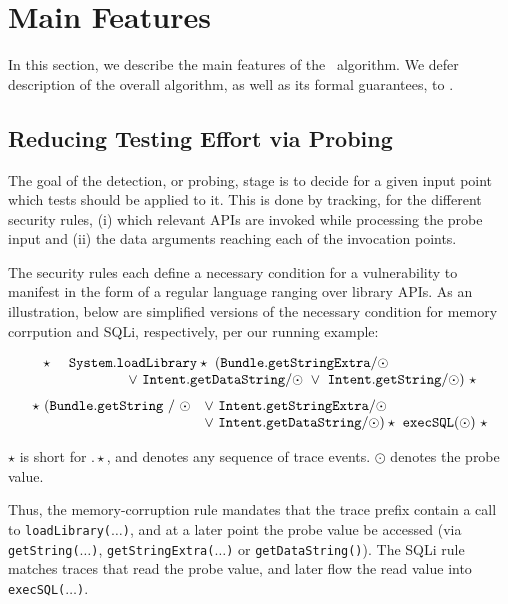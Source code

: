 \section{Main Features}\label{Se:corealg}

In this section, we describe the main features of the \Tool\ algorithm. We defer description of the overall algorithm, as well as its formal guarantees, to .

\subsection{Reducing Testing Effort via Probing}\label{Se:detectionSubsec}

The goal of the detection, or probing, stage is to decide for a given input point which tests should be applied to it. This is done by tracking, for the different security rules, (i) which relevant APIs are invoked while processing the probe input and (ii) the data arguments reaching each of the invocation points. 

The security rules each define a necessary condition for a vulnerability to manifest in the form of a regular language ranging over library APIs. As an illustration, below are simplified versions of the necessary condition for memory corrpution and SQLi, respectively, per our running example:

\begin{scriptsize}
$$
\begin{array}{rl}
	\star\ & {\tt System.loadLibrary}  
	\star\ ({\tt Bundle.getStringExtra / \odot} \\ & \hspace{1.5cm} \vee\ {\tt Intent.getDataString / \odot}\  
	\vee\ {\tt Intent.getString / \odot})\ \star
\end{array}
$$
$$
\begin{array}{rl}
	\star\ ({\tt Bundle.getString\ /\ \odot} & \vee\ {\tt Intent.getStringExtra / \odot} \\ 
	& \vee\ {\tt Intent.getDataString / \odot}) \star\ {\tt execSQL(\odot)}\ \star
\end{array}
$$
\end{scriptsize}
$\star$ is short for $. \star$, and denotes any sequence of trace events. $\odot$ denotes the probe value. 

Thus, the memory-corruption rule mandates that the trace prefix contain a call to {\tt loadLibrary($\ldots$)}, and at a later point the probe value be accessed (via {\tt getString($\ldots$)}, {\tt getStringExtra($\ldots$)} or {\tt getDataString()}). The SQLi rule matches traces that read the probe value, and later flow the read value into {\tt execSQL($\ldots$)}.

